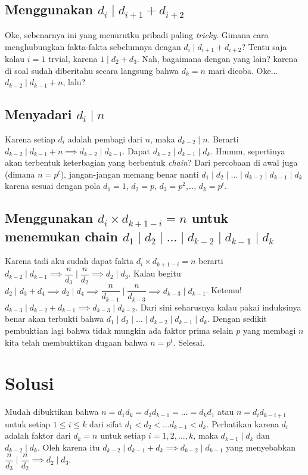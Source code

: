 \subsection{Menggunakan $d_i \mid d_{i+1} + d_{i+2}$}
Oke, sebenarnya ini yang menurutku pribadi paling \textit{tricky}. Gimana cara menghubungkan fakta-fakta sebelumnya dengan $d_i \mid d_{i+1} + d_{i+2}$? Tentu saja kalau $i=1$ trvial, karena $1 \mid d_2+d_3$. Nah, bagaimana dengan yang lain? karena di soal sudah diberitahu secara langsung bahwa $d_k=n$ mari dicoba. Oke... $d_{k-2} \mid d_{k-1} + n$, lalu? 

\subsection{Menyadari $d_i \mid n$}
Karena setiap $d_i$ adalah pembagi dari $n$, maka $d_{k-2} \mid n$. Berarti $d_{k-2} \mid d_{k-1} + n \implies d_{k-2} \mid d_{k-1}$. Dapat $d_{k-2} \mid d_{k-1} \mid d_k$. Hmmm, sepertinya akan terbentuk keterbagian yang berbentuk \textit{chain}? Dari percobaan di awal juga (dimana $n=p^t$), jangan-jangan memang benar nanti $d_1 \mid d_2 \mid \dots \mid d_{k-2} \mid d_{k-1} \mid d_k$ karena sesuai dengan pola $d_1 = 1$, $d_2=p$, $d_3=p^2$,\dots, $d_k=p^t$.

\subsection{Menggunakan $d_{i} \times d_{k+1-i}=n$ untuk menemukan chain $d_1 \mid d_2 \mid \dots \mid d_{k-2} \mid d_{k-1} \mid d_k$}
Karena tadi aku sudah dapat fakta $d_{i} \times d_{k+1-i}=n$ berarti $d_{k-2} \mid d_{k-1} \implies \dfrac{n}{d_{3}} \mid \dfrac{n}{d_{2}} \implies d_2 \mid d_3$. Kalau begitu $d_2 \mid d_3 + d_4 \implies d_2 \mid d_4 \implies \dfrac{n}{d_{k-1}} \mid \dfrac{n}{d_{k-3}} \implies d_{k-3} \mid d_{k-1}$. Ketemu! $d_{k-3} \mid d_{k-2} + d_{k-1} \implies d_{k-3} \mid d_{k-2}$. Dari sini seharusnya kalau pakai induksinya benar akan terbukti bahwa $d_1 \mid d_2 \mid \dots \mid d_{k-2} \mid d_{k-1} \mid d_k$. Dengan sedikit pembuktian lagi bahwa tidak mungkin ada faktor prima selain $p$ yang membagi $n$ kita telah membuktikan dugaan bahwa $n=p^t$. Selesai.

\section{Solusi}
Mudah dibuktikan bahwa $n = d_1 d_{k} = d_2d_{k-1} = \dots = d_k d_1$ atau $n = d_id_{k-i+1}$ untuk setiap $1 \le i \le k$ dari sifat $d_1 < d_2 < \dots d_{k-1} < d_k$. Perhatikan karena $d_i$ adalah faktor dari $d_k = n$ untuk setiap $i=1,2,\dots,k$, maka $d_{k-1} \mid d_k$ dan $d_{k-2} \mid d_k$. Oleh karena itu $d_{k-2} \mid d_{k-1} + d_k \implies d_{k-2} \mid d_{k-1}$ yang menyebabkan $\dfrac{n}{d_3} \mid \dfrac{n}{d_2} \implies d_2 \mid d_3$.

